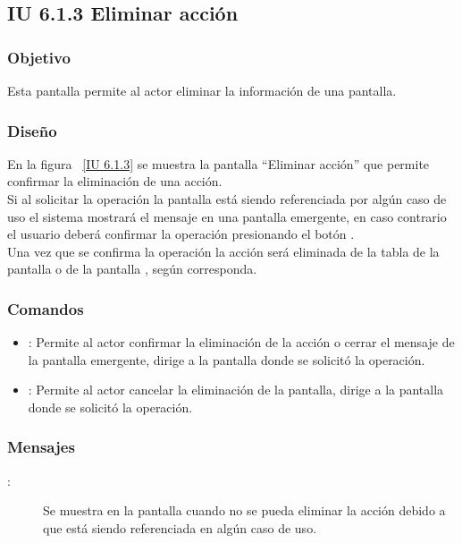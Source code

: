 \subsection{IU 6.1.3 Eliminar acción}

\subsubsection{Objetivo}
	
	Esta pantalla permite al actor eliminar la información de una pantalla.

\subsubsection{Diseño}

    En la figura ~\ref{IU 6.1.3} se muestra la pantalla ``Eliminar acción'' que permite confirmar la eliminación de una acción. \\
    
    Si al solicitar la operación la pantalla está siendo referenciada por algún caso de uso el sistema mostrará el mensaje  en una pantalla emergente, en caso contrario el usuario 
    deberá confirmar la operación presionando el botón .\\
    
    Una vez que se confirma la operación la acción será eliminada de la tabla de la pantalla  o de la pantalla , según corresponda.  \\



\subsubsection{Comandos}
\begin{itemize}
	\item {}: Permite al actor confirmar la eliminación de la acción o cerrar el mensaje  de la pantalla emergente, dirige a la pantalla donde se solicitó la operación.
	\item {}: Permite al actor cancelar la eliminación de la pantalla, dirige a la pantalla donde se solicitó la operación.
\end{itemize}

\subsubsection{Mensajes}
	
\begin{description}
	\item[:] Se muestra en la pantalla  cuando no se pueda eliminar la acción debido a que está siendo referenciada en algún caso de uso.	
	
\end{description}
